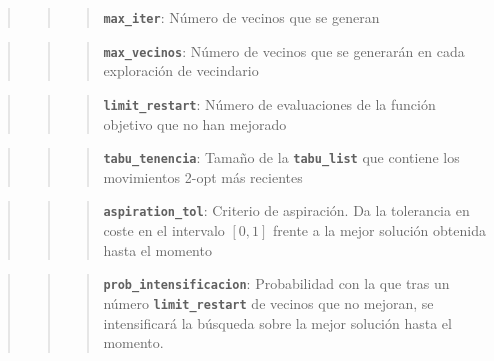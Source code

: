 \documentclass{article}
\begin{document}
\begin{quote}
\begin{quote}
\begin{quote}
\textbf{\texttt{max\_iter}}: Número de vecinos que se generan
\end{quote}
\end{quote}
\end{quote}

\begin{quote}
\begin{quote}
\begin{quote}
\textbf{\texttt{max\_vecinos}}: Número de vecinos que se generarán en
cada exploración de vecindario
\end{quote}
\end{quote}
\end{quote}

\begin{quote}
\begin{quote}
\begin{quote}
\textbf{\texttt{limit\_restart}}: Número de evaluaciones de la función
objetivo que no han mejorado
\end{quote}
\end{quote}
\end{quote}

\begin{quote}
\begin{quote}
\begin{quote}
\textbf{\texttt{tabu\_tenencia}}: Tamaño de la
\textbf{\texttt{tabu\_list}} que contiene los movimientos 2-opt más
recientes
\end{quote}
\end{quote}
\end{quote}

\begin{quote}
\begin{quote}
\begin{quote}
\textbf{\texttt{aspiration\_tol}}: Criterio de aspiración. Da la
tolerancia en coste en el intervalo $[0,1]$ frente a la mejor solución
obtenida hasta el momento
\end{quote}
\end{quote}
\end{quote}

\begin{quote}
\begin{quote}
\begin{quote}
\textbf{\texttt{prob\_intensificacion}}: Probabilidad con la que tras un
número \textbf{\texttt{limit\_restart}} de vecinos que no mejoran, se
intensificará la búsqueda sobre la mejor solución hasta el momento.
\end{quote}
\end{quote}
\end{quote}
\end{document}
